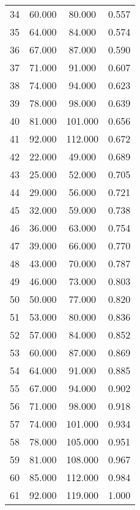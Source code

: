 \begin{tabular}{cccc}
  34 & 60.000 & 80.000 & 0.557 \\ 
  35 & 64.000 & 84.000 & 0.574 \\ 
  36 & 67.000 & 87.000 & 0.590 \\ 
  37 & 71.000 & 91.000 & 0.607 \\ 
  38 & 74.000 & 94.000 & 0.623 \\ 
  39 & 78.000 & 98.000 & 0.639 \\ 
  40 & 81.000 & 101.000 & 0.656 \\ 
  41 & 92.000 & 112.000 & 0.672 \\ 
  42 & 22.000 & 49.000 & 0.689 \\ 
  43 & 25.000 & 52.000 & 0.705 \\ 
  44 & 29.000 & 56.000 & 0.721 \\ 
  45 & 32.000 & 59.000 & 0.738 \\ 
  46 & 36.000 & 63.000 & 0.754 \\ 
  47 & 39.000 & 66.000 & 0.770 \\ 
  48 & 43.000 & 70.000 & 0.787 \\ 
  49 & 46.000 & 73.000 & 0.803 \\ 
  50 & 50.000 & 77.000 & 0.820 \\ 
  51 & 53.000 & 80.000 & 0.836 \\ 
  52 & 57.000 & 84.000 & 0.852 \\ 
  53 & 60.000 & 87.000 & 0.869 \\ 
  54 & 64.000 & 91.000 & 0.885 \\ 
  55 & 67.000 & 94.000 & 0.902 \\ 
  56 & 71.000 & 98.000 & 0.918 \\ 
  57 & 74.000 & 101.000 & 0.934 \\ 
  58 & 78.000 & 105.000 & 0.951 \\ 
  59 & 81.000 & 108.000 & 0.967 \\ 
  60 & 85.000 & 112.000 & 0.984 \\ 
  61 & 92.000 & 119.000 & 1.000 \\ 
   \hline
\end{tabular}
